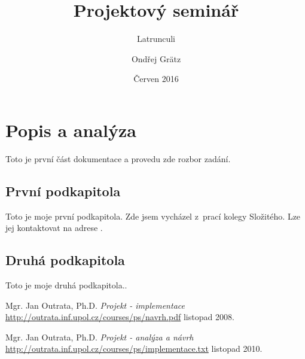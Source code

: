 \documentclass[12pt]{article}
\title{Projektový seminář}
\subtitle{Latrunculi}
\author{Ondřej Grätz}
\date{Červen 2016}
\begin{document}
\maketitle

\newpage
\section{Popis a analýza}
Toto je první část dokumentace a provedu zde rozbor zadání.

\subsection{První podkapitola}
Toto je moje první podkapitola.
Zde jsem vycházel z~prací kolegy Složitého. Lze jej kontaktovat 
na adrese .

\subsection{Druhá podkapitola}
Toto je moje druhá podkapitola..


\newpage
\begin{thebibliography}{10}

	
 Mgr. Jan Outrata, Ph.D. \emph{Projekt - implementace}
 \url{http://outrata.inf.upol.cz/courses/ps/navrh.pdf}
			listopad 2008.

	
 Mgr. Jan Outrata, Ph.D. \emph{Projekt - analýza a návrh}
 \url{http://outrata.inf.upol.cz/courses/ps/implementace.txt}
			listopad 2010.

\end{thebibliography} 
\end{document}
